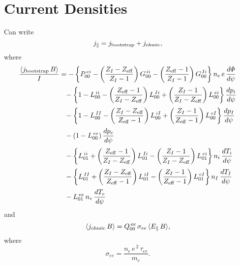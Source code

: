 \documentclass[12pt]{article}
\begin{document}
\section{Current Densities}
Can write
\begin{equation}
j_\parallel = j_{\rm bootstrap} + j_{\rm ohmic},
\end{equation}
where
\begin{align}
\frac{\langle j_{\rm bootstrap}\,B\rangle}{I}&=-\left\{P_{00}^{\,ei}-\left(\frac{Z_I-Z_{\rm eff}}{Z_I-1}\right)G^{\,ii}_{00}- \left(\frac{Z_{\rm eff}-1}{Z_I-1}\right)G_{00}^{\,Ii}\right\}n_e\,e\,\frac{d{\mit\Phi}}{d\psi}\nonumber\\[0.5ex]
&\phantom{=} -\left\{1-L^{\,ii}_{00} - \left(\frac{Z_{\rm eff}-1}{Z_I-Z_{\rm eff}}\right)L^{\,Ii}_{00}
+ \left(\frac{Z_I-1}{Z_I-Z_{\rm eff}}\right)L^{\,ei}_{00}\right\}\frac{dp_i}{d\psi}\nonumber\\[0.5ex]
&\phantom{=}
- \left\{1-L^{\,II}_{00} - \left(\frac{Z_I-Z_{\rm eff}}{Z_{\rm eff}-1}\right)L^{\,iI}_{00}
+ \left(\frac{Z_I-1}{Z_{\rm eff}-1}\right)L^{\,eI}_{00}\right\}\frac{dp_I}{d\psi}
\nonumber\\[0.5ex]
&\phantom{=}-(1-L^{\,ee}_{00})\,\frac{dp_e}{d\psi}\nonumber\\[0.5ex]
&\phantom{=}- \left\{L^{\,ii}_{01} + \left(\frac{Z_{\rm eff}-1}{Z_I-Z_{\rm eff}}\right)L^{\,Ii}_{01}
- \left(\frac{Z_I-1}{Z_I-Z_{\rm eff}}\right)L^{\,ei}_{01}\right\}n_i\,\frac{dT_i}{d\psi}\nonumber\\[0.5ex]
&\phantom{=}
- \left\{L^{\,II}_{01} + \left(\frac{Z_I-Z_{\rm eff}}{Z_{\rm eff}-1}\right)L^{\,iI}_{01}
- \left(\frac{Z_I-1}{Z_{\rm eff}-1}\right)L^{\,eI}_{01}\right\}n_I\,\frac{dT_I}{d\psi}
\nonumber\\[0.5ex]
&\phantom{=}-L^{\,ee}_{01}\,n_e\,\frac{dT_e}{d\psi}
\end{align}
and
\begin{equation}
\langle j_{\rm ohmic}\,B\rangle = Q^{\,ee}_{00}\,\sigma_{ee}\,\langle E_\parallel\,B\rangle,
\end{equation}
where 
\begin{equation}
\sigma_{ee} = \frac{n_e\,e^{\,2}\,\tau_{ee}}{m_e}.
\end{equation}
\end{document}
